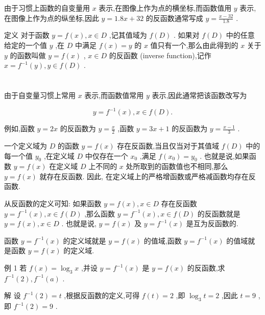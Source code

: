 \documentclass[10pt]{article}
\begin{document}
由于习惯上函数的自变量用 \(x\) 表示,在图像上作为点的横坐标,而函数值用 \(y\) 表示,在图像上作为点的纵坐标,因此 \(y = {1.8x} + {32}\) 的反函数通常写成 \(y = \frac{x - {32}}{1.8}\) .

定义 对于函数 \(y = f\left( x\right) ,x \in  D\) ,记其值域为 \(f\left( D\right)\) . 如果对 \(f\left( D\right)\) 中的任意给定的一个值 \(y\) ,在 \(D\) 中满足 \(f\left( x\right)  = y\) 的 \(x\) 值只有一个,那么由此得到的 \(x\) 关于 \(y\) 的函数叫做 \(y = f\left( x\right)\) , \(x \in  D\) 的反函数 (inverse function),记作 \(x = {f}^{-1}\left( y\right) ,y \in  f\left( D\right)\) .

\section*{}

由于自变量习惯上常用 \(x\) 表示,而函数值常用 \(y\) 表示,因此通常把该函数改写为

\[
y = {f}^{-1}\left( x\right) ,x \in  f\left( D\right) .
\]

例如,函数 \(y = {2x}\) 的反函数为 \(y = \frac{x}{2}\) ,函数 \(y = {3x} + 1\) 的反函数为 \(y = \frac{x - 1}{3}\) .

一个定义域为 \(D\) 的函数 \(y = f\left( x\right)\) 存在反函数,当且仅当对于其值域 \(f\left( D\right)\) 中的每一个值 \({y}_{0}\) ,在定义域 \(D\) 中仅存在一个 \({x}_{0}\) ,满足 \(f\left( {x}_{0}\right)  = {y}_{0}\) . 也就是说,如果函数 \(y = f\left( x\right)\) 在定义域 \(D\) 上不同的 \(x\) 处所取到的函数值也不相同,那么 \(y = f\left( x\right)\) 就存在反函数. 因此, 在定义域上的严格增函数或严格减函数均存在反函数.

从反函数的定义可知: 如果函数 \(y = f\left( x\right) ,x \in  D\) 存在反函数 \(y = {f}^{-1}\left( x\right) ,x \in  f\left( D\right)\) ,那么函数 \(y = {f}^{-1}\left( x\right) ,x \in  f\left( D\right)\) 的反函数就是 \(y = f\left( x\right) ,x \in  D\) . 也就是说, \(y = f\left( x\right)\) 及 \(y = {f}^{-1}\left( x\right)\) 是互为反函数的.

函数 \(y = {f}^{-1}\left( x\right)\) 的定义域就是 \(y = f\left( x\right)\) 的值域,函数 \(y = {f}^{-1}\left( x\right)\) 的值域就是函数 \(y = f\left( x\right)\) 的定义域.

例 1 若 \(f\left( x\right)  = {\log }_{3}x\) ,并设 \(y = {f}^{-1}\left( x\right)\) 是 \(y = f\left( x\right)\) 的反函数,求 \({f}^{-1}\left( 2\right) ,{f}^{-1}\left( a\right)\) .

解 设 \({f}^{-1}\left( 2\right)  = t\) ,根据反函数的定义,可得 \(f\left( t\right)  = 2\) ,即 \({\log }_{3}t = 2\) ,因此 \(t = 9\) ,即 \({f}^{-1}\left( 2\right)  = 9\) .
\end{document}
